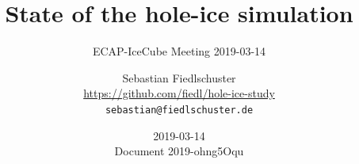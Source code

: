\documentclass[green, 12pt]{beamer}
\title{State of the hole-ice simulation}
\subtitle{ECAP-IceCube Meeting 2019-03-14}
\date{2019-03-14 \\ \vspace*{2mm} \tiny{Document 2019-ohng5Oqu} \normalsize}
\author[Sebastian Fiedlschuster, ECAP Erlangen]{Sebastian Fiedlschuster \\ \tiny{\url{https://github.com/fiedl/hole-ice-study}} \\ \tiny\texttt{sebastian@fiedlschuster.de}}
\institute{Erlangen Centre for Astroparticle Physics}
\newif\ifplacelogo %
\begin{document}



\placelogofalse



%   
%
%
%     
%
%     
%     
%     
%     
%     
%
%     
%
%     
%
%   
%

\end{document}
